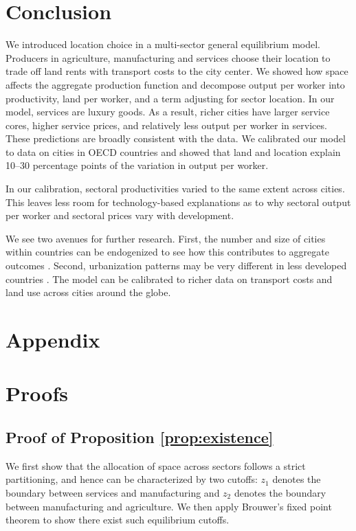 \documentclass[12pt]{article}
\begin{document}
\section{Conclusion}
We introduced location choice in a multi-sector general equilibrium model. Producers in agriculture, manufacturing and services choose their location to trade off land rents with transport costs to the city center. We showed how space affects the aggregate production function and decompose output per worker into productivity, land per worker, and a term adjusting for sector location. In our model, services are luxury goods. As a result, richer cities have larger service cores, higher service prices, and relatively less output per worker in services. These predictions are broadly consistent with the data. We calibrated our model to data on cities in OECD countries and showed that land and location explain 10--30 percentage points of the variation in output per worker.

In our calibration, sectoral productivities varied to the same extent across cities. This leaves less room for technology-based explanations as to why sectoral output per worker and sectoral prices vary with development.

We see two avenues for further research. First, the number and size of cities within countries can be endogenized to see how this contributes to aggregate outcomes \cite{Desmet2013,Ramondo2016-qy}. Second, urbanization patterns may be very different in less developed countries \cite{Glaeser2014-gd,Harari2016-cx}. The model can be calibrated to richer data on transport costs and land use across cities around the globe.
\clearpage




\clearpage

\appendix
\section*{Appendix}
\section{Proofs}
\subsection{Proof of Proposition \ref{prop:existence}}
We first show that the allocation of space across sectors follows a strict partitioning, and hence can be characterized by two cutoffs: $z_1$ denotes the boundary between services and manufacturing and $z_2$ denotes the boundary between manufacturing and agriculture. We then apply Brouwer's fixed point theorem to show there exist such equilibrium cutoffs.
\end{document}
